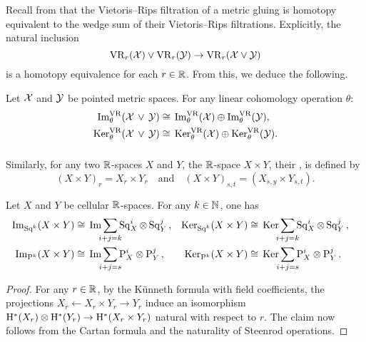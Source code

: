 Recall from \cite[Proposition 1]{adamaszek2020homotopy} that the Vietoris--Rips filtration of a metric gluing is homotopy equivalent to the wedge sum of their Vietoris--Rips filtrations.
Explicitly, the natural inclusion
\[
\mathrm{VR}_r(\mathcal{X}) \vee \mathrm{VR}_r(\mathcal{Y}) \to \mathrm{VR}_r(\mathcal{X} \vee \mathcal{Y})
\]
is a homotopy equivalence for each $r \in \mathbb{R}$.
From this, we deduce the following.

\medskip\corollary
Let $\mathcal{X}$ and $\mathcal{Y}$ be pointed metric spaces.
For any linear cohomology operation $\theta$:
\begin{align*}
	\operatorname{Im}_\theta^{\mathrm{VR}}(\mathcal{X} \, \vee \, \mathcal{Y}) &\cong \, \operatorname{Im}_\theta^{\mathrm{VR}}(\mathcal{X}) \oplus \operatorname{Im}_\theta^{\mathrm{VR}}(\mathcal{Y}), \\
	\operatorname{Ker}_\theta^{\mathrm{VR}}(\mathcal{X} \, \vee \, \mathcal{Y}) &\cong \, \operatorname{Ker}_\theta^{\mathrm{VR}}(\mathcal{X}) \oplus \operatorname{Ker}_\theta^{\mathrm{VR}}(\mathcal{Y}).
\end{align*}

\subsubsection{}

Similarly, for any two $\mathbb{R}$-spaces $X$ and $Y$, the $\mathbb{R}$-space $X \times Y$, their , is defined by
\[
(X \times Y)_r = X_r \times Y_r \quad\text{and}\quad (X \times Y)_{s,t} = (X_{s,y} \times Y_{s,t}).
\]


\medskip\theorem
Let $X$ and $Y$ be cellular $\mathbb{R}$-spaces.
For any $k \in \mathbb{N}$, one has
\begin{align*}
	\img_{\Sq^k}(X \times Y) &\cong\, \img\sum_{\mathclap{i+j=k}} \Sq^i_X \ot \Sq^j_Y\,, &
	\ker_{\Sq^k}(X \times Y) &\cong\, \ker\sum_{\mathclap{i+j=k}} \Sq^i_X \ot \Sq^j_Y\,, \\
	\img_{\rP^k}(X \times Y) &\cong\, \img\sum_{\mathclap{i+j=s}} \rP^i_X \otimes \rP^j_Y\,, &
	\ker_{\rP^k}(X \times Y) &\cong\, \ker\sum_{\mathclap{i+j=s}} \rP^i_X \otimes \rP^j_Y\,. &
\end{align*}

\begin{proof}
	For any \(r \in \mathbb{R}\), by the K\"unneth formula with field coefficients, the projections $X_r \leftarrow X_r \times Y_r \to Y_r$ induce an isomorphism $\mathrm{H}^*(X_r) \otimes \mathrm{H}^*(Y_r) \to \mathrm{H}^*(X_r \times Y_r)$ natural with respect to \(r\).
	The claim now follows from the Cartan formula and the naturality of Steenrod operations.
\end{proof}

